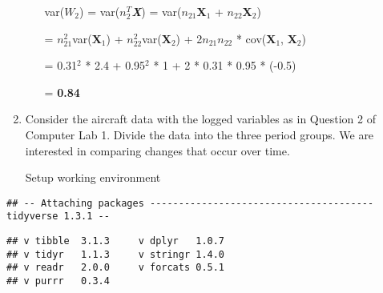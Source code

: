 \documentclass[
]{article}
\newenvironment{Shaded}{\begin{snugshade}}{\end{snugshade}}
\newcommand{\AttributeTok}[1]{\textcolor[rgb]{0.77,0.63,0.00}{#1}}
\newcommand{\ConstantTok}[1]{\textcolor[rgb]{0.00,0.00,0.00}{#1}}
\newcommand{\ControlFlowTok}[1]{\textcolor[rgb]{0.13,0.29,0.53}{\textbf{#1}}}
\newcommand{\FunctionTok}[1]{\textcolor[rgb]{0.00,0.00,0.00}{#1}}
\newcommand{\NormalTok}[1]{#1}
\newcommand{\SpecialCharTok}[1]{\textcolor[rgb]{0.00,0.00,0.00}{#1}}
\newcommand{\StringTok}[1]{\textcolor[rgb]{0.31,0.60,0.02}{#1}}
\begin{document}
\begin{enumerate}
\begin{enumerate}
    var(\(W_2\)) = var(\(n_2 ^T\)\textbf{\emph{X}}) =
    var(\(n_{21}\)\textbf{X}\(_1\) + \(n_{22}\)\textbf{X}\(_2\))

    = \(n_{21}^2\)var(\textbf{X}\(_1\)) +
    \(n_{22}^2\)var(\textbf{X}\(_2\)) + 2\(n_{21}n_{22}\) *
    cov(\textbf{X}\(_1\), \textbf{X}\(_2\))

    = 0.31\(^2\) * 2.4 + 0.95\(^2\) * 1 + 2 * 0.31 * 0.95 * (-0.5)

    = \textbf{0.84}
  \end{enumerate}
\item
  Consider the aircraft data with the logged variables as in Question 2
  of Computer Lab 1. Divide the data into the three period groups. We
  are interested in comparing changes that occur over time.

  Setup working environment
\end{enumerate}

\begin{Shaded}
\end{Shaded}

\begin{verbatim}
## -- Attaching packages --------------------------------------- tidyverse 1.3.1 --
\end{verbatim}

\begin{verbatim}
## v tibble  3.1.3     v dplyr   1.0.7
## v tidyr   1.1.3     v stringr 1.4.0
## v readr   2.0.0     v forcats 0.5.1
## v purrr   0.3.4
\end{verbatim}
\end{document}
